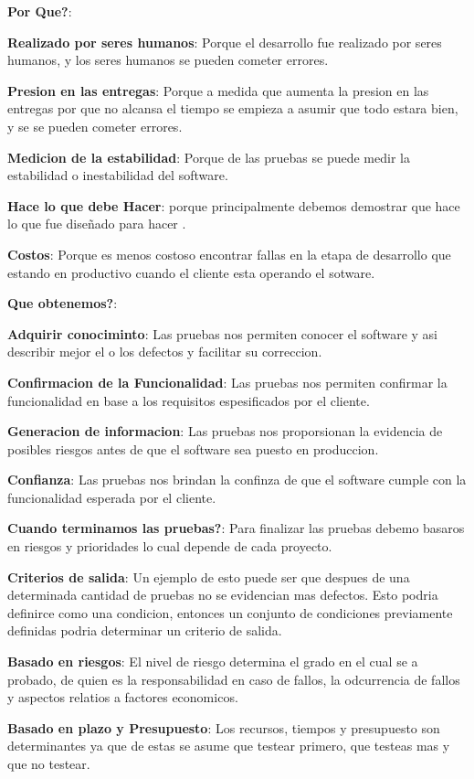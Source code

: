 \documentclass[12pt,a4paper,twoside]{article}
\begin{document}
\begin{list}{•}{}
\item \textbf{Por Que?}: 
\begin{list}{•}{}
\item \textbf{Realizado por seres humanos}: Porque el desarrollo fue realizado por seres humanos, y los seres humanos se pueden cometer errores.
\item \textbf{Presion en las entregas}: Porque a medida que aumenta la presion en las entregas por que no alcansa el tiempo se empieza a asumir que todo estara bien, y se se pueden cometer errores.
\item \textbf{Medicion de la estabilidad}: Porque de las pruebas se puede medir la estabilidad o inestabilidad del software.
\item \textbf{Hace lo que debe Hacer}: porque principalmente debemos demostrar que hace lo que fue diseñado para hacer .
\item \textbf{Costos}: Porque es menos costoso encontrar fallas en la etapa de desarrollo que estando en productivo cuando el cliente esta operando el sotware.
\end{list}
\item \textbf{Que obtenemos?}:
\begin{list}{•}{}
\item \textbf{Adquirir conociminto}: Las pruebas nos permiten conocer el software y asi describir mejor el o los defectos y facilitar su correccion.
\item \textbf{Confirmacion de la Funcionalidad}: Las pruebas nos permiten confirmar la funcionalidad en base a los requisitos espesificados por el cliente.
\item \textbf{Generacion de informacion}: Las pruebas nos proporsionan la evidencia de posibles riesgos antes de que el software sea puesto en produccion.
\item \textbf{Confianza}: Las pruebas nos brindan la confinza de que el software cumple con la funcionalidad esperada por el cliente.
\end{list}
\item \textbf{Cuando terminamos las pruebas?}: Para finalizar las pruebas debemo basaros en riesgos y prioridades lo cual depende de cada proyecto.
\begin{list}{•}{}
\item \textbf{Criterios de salida}: Un ejemplo de esto puede ser que despues de una determinada cantidad de pruebas no se evidencian mas defectos. Esto podria definirce como una condicion, entonces un conjunto de condiciones previamente definidas podria determinar un criterio de salida.
\item \textbf{Basado en riesgos}: El nivel de riesgo determina el grado en el cual se a probado, de quien es la responsabilidad en caso de fallos, la odcurrencia de fallos y aspectos relatios a factores economicos.
\item \textbf{Basado en plazo y Presupuesto}: Los recursos, tiempos y presupuesto son determinantes ya que de estas se asume que testear primero, que testeas mas y que no testear.
\end{list}
\end{list}
\end{document}
